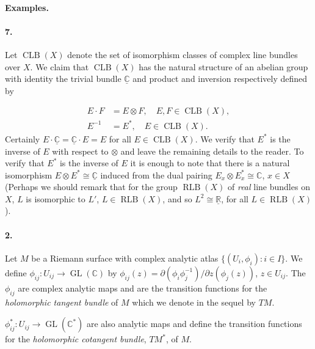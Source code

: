 \paragraph*{Examples.}
\paragraph*{7.} Let $\operatorname{CLB}(X)$ denote the set of isomorphism classes of complex line bundles over $X$. We claim that $\operatorname{CLB}(X)$ has the natural structure of an abelian group with identity the trivial bundle $\underline{\mathbb C}$ and product and inversion respectively defined by

\begin{align*}
E\cdot F&=E\otimes F,\quad E,F\in\operatorname{CLB}(X),\\
E^{-1}&=E^*,\quad E\in\operatorname{CLB}(X).
\end{align*}
Certainly $E\cdot\underline{\mathbb C}=\underline{\mathbb C}\cdot E=E$ for all $E\in\operatorname{CLB}(X)$. We verify that $E^*$ is the inverse of $E$ with respect to $\otimes$ and leave the remaining details to the reader. To verify that $E^*$ is the inverse of $E$ it is enough to note that there is a natural isomorphism $E\otimes E^*\cong\underline{\mathbb C}$ induced from the dual pairing $E_x\otimes E_x^*\cong\mathbb C$, $x\in X$ (Perhaps we should remark that for the group $\operatorname{RLB}(X)$ of \emph{real} line bundles on $X$, $L$ is isomorphic to $L'$, $L\in\operatorname{RLB}(X)$, and so $L^2\cong\underline{\mathbb R}$, for all $L\in\operatorname{RLB}(X)$).

\paragraph*{2.} Let $M$ be a Riemann surface with complex analytic atlas $\{(U_i,\phi_i):i\in I\}$. We define $\phi_{ij}:U_{ij}\to\operatorname{GL}(\mathbb C)$ by $\phi_{ij}(z)=\partial(\phi_i\phi_j^{-1})/\partial z(\phi_j(z))$, $z\in U_{ij}$. The $\phi_{ij}$ are complex analytic maps and are the transition functions for the \emph{holomorphic tangent bundle} of $M$ which we denote in the sequel by $TM$.

$\phi_{ij}^*:U_{ij}\to\operatorname{GL}(\mathbb C^*)$ are also analytic maps and define the transition functions for the \emph{holomorphic cotangent bundle}, $TM^*$, of $M$.

